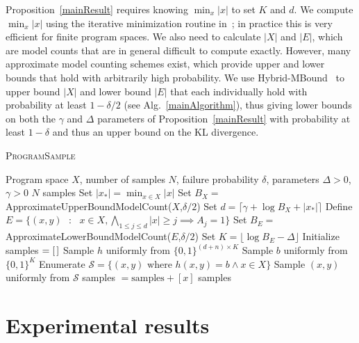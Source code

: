 \documentclass{article}
\newcommand{\theSystem}{\textsc{ProgramSample}}
\begin{document}
  Proposition~\ref{mainResult} requires knowing $\min_x \lvert x \rvert $ to set $K$ and $d$. We compute $\min_x \lvert x \rvert $ using the iterative minimization routine in~\cite{singh2013automated}; in practice this is very efficient for finite program spaces. We also need to calculate $|X|$ and $|E|$, which are model counts that are in general difficult to compute exactly.
  However, many approximate model counting schemes exist, which provide upper and lower bounds that hold with arbitrarily high probability.
  We use Hybrid-MBound~\cite{gomes2006model} to upper bound $|X|$ and lower bound $|E|$ that each individually hold with probability at least $1-\delta / 2$ (see Alg.~\ref{mainAlgorithm}), thus
  giving lower bounds on both the $\gamma$ and $\Delta$ parameters of Proposition~\ref{mainResult} with probability at least $1-\delta$
  and thus an upper bound on the KL divergence. 

   
  \begin{algorithm}[tb]
   \caption{\theSystem{}}
   \label{mainAlgorithm}
\begin{algorithmic}
   Program space $X$, number of samples $N$, failure probability $\delta$, parameters $\Delta > 0$, $\gamma > 0$
   $N$ samples 
  \STATE Set $\lvert x_* \rvert  = \min_{x\in X} \lvert x \rvert $
  \STATE Set $B_X = $ ApproximateUpperBoundModelCount($X$,$\delta/2$)
  \STATE Set $d = \lceil \gamma + \log B_X + |x_* |\rceil$
  \STATE Define $E = \{(x,y) \text{ }:\text{ } x\in X,  \bigwedge_{1\leq j \leq d}  \lvert x \rvert \geq j\implies A_j=1 \}$
  \STATE Set $B_E = $ ApproximateLowerBoundModelCount($E$,$\delta/2$)
  \STATE Set $K = \lfloor \log B_E - \Delta \rfloor $
  \STATE Initialize samples $ = [\hspace{0.05cm}]$
  \REPEAT
  \STATE Sample $h$ uniformly from $\{0,1\}^{(d+n)\times K}$
  \STATE Sample $b$ uniformly from $\{0,1\}^{K}$
  \STATE Enumerate $\mathcal{S} = \{ (x,y) \text{ where } h(x,y) = b \wedge x\in X\}$
  \STATE Sample $(x,y)$ uniformly from $\mathcal{S}$
  \STATE samples $ = \text{samples}+ [x]$
  \ENDIF
   \ENDIF
    samples
\end{algorithmic}
  \end{algorithm}



 

     
  \section{Experimental results}
\end{document}
